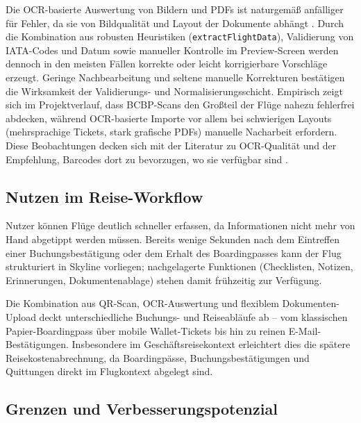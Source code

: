 Die OCR-basierte Auswertung von Bildern und PDFs ist naturgemäß anfälliger für Fehler, da sie von Bildqualität und Layout der Dokumente abhängt \cite{mlKitTextRecognition,tesseractOcr}.
Durch die Kombination aus robusten Heuristiken (\texttt{extractFlightData}), Validierung von IATA-Codes und Datum sowie manueller Kontrolle im Preview-Screen werden dennoch in den meisten Fällen korrekte oder leicht korrigierbare Vorschläge erzeugt.
Geringe Nachbearbeitung und seltene manuelle Korrekturen bestätigen die Wirksamkeit der Validierungs- und Normalisierungsschicht.
Empirisch zeigt sich im Projektverlauf, dass BCBP-Scans den Großteil der Flüge nahezu fehlerfrei abdecken, während OCR-basierte Importe vor allem bei schwierigen Layouts (mehrsprachige Tickets, stark grafische PDFs) manuelle Nacharbeit erfordern.
Diese Beobachtungen decken sich mit der Literatur zu OCR-Qualität und der Empfehlung, Barcodes dort zu bevorzugen, wo sie verfügbar sind \cite{mlKitTextRecognition,tesseractOcr}.

\subsection{Nutzen im Reise-Workflow}

Nutzer können Flüge deutlich schneller erfassen, da Informationen nicht mehr von Hand abgetippt werden müssen.
Bereits wenige Sekunden nach dem Eintreffen einer Buchungsbestätigung oder dem Erhalt des Boardingpasses kann der Flug strukturiert in Skyline vorliegen; nachgelagerte Funktionen (Checklisten, Notizen, Erinnerungen, Dokumentenablage) stehen damit frühzeitig zur Verfügung.

Die Kombination aus QR-Scan, OCR-Auswertung und flexiblem Dokumenten-Upload deckt unterschiedliche Buchungs- und Reiseabläufe ab -- vom klassischen Papier-Boardingpass über mobile Wallet-Tickets bis hin zu reinen E-Mail-Bestätigungen.
Insbesondere im Geschäftsreisekontext erleichtert dies die spätere Reisekostenabrechnung, da Boardingpässe, Buchungsbestätigungen und Quittungen direkt im Flugkontext abgelegt sind.

\subsection{Grenzen und Verbesserungspotenzial}


